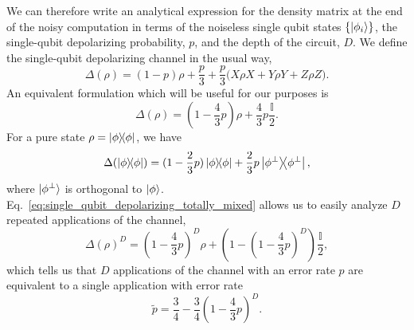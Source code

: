 \documentclass[
amsmath,
amssymb,
aps,
pra,
reprint,
twocolumn,
superscriptaddress,
longbibliography,
showkeys,
floatfix
]{revtex4-1}
\def\ket#1{\ensuremath{\mathinner{|{#1}\rangle}}}
\newcommand{\eq}[1]{Eq.~\hyperref[eq:#1]{\ref*{eq:#1}}}
\begin{document}
We can therefore write an analytical expression for the density matrix at the
end of the noisy computation in terms of the noiseless single qubit states
\(\{\ket{\phi_i}\}\), the single-qubit depolarizing probability, \(p\), and the
depth of the circuit, \(D\).
We define the single-qubit depolarizing channel in the usual way,
\begin{equation}
  \Delta(\rho) = (1-p) \rho + \frac{p}{3} + \frac{p}{3}\big(X\rho X + Y\rho Y + Z\rho Z \big).
  \label{eq:single_qubit_depolarizing}
\end{equation}
An equivalent formulation which will be useful for our purposes is
\begin{equation}
  \Delta(\rho) = (1 - \frac{4}{3}p) \rho + \frac{4}{3}p\frac{\mathbb{I}}{2}.
  \label{eq:single_qubit_depolarizing_totally_mixed}
\end{equation}
For a pure state \(\rho = \ketbra{\phi}\), we have
\begin{equation}
  \Delta(\ketbra{\phi}) = (1 - \frac{2}{3}p) \ketbra{\phi} + \frac{2}{3}p \ketbra{\phi^\perp},
\end{equation}
where \(\ket{\phi^\perp}\) is orthogonal to \(\ket{\phi}\).
\eq{single_qubit_depolarizing_totally_mixed} allows us to easily analyze \(D\)
repeated applications of the channel,
\begin{equation}
  \Delta(\rho)^D = (1 - \frac{4}{3}p)^D \rho + (1- (1 - \frac{4}{3}p)^D)\frac{\mathbb{I}}{2},
\end{equation}
which tells us that \(D\) applications of the channel with an error rate \(p\)
are equivalent to a single application with error rate
\begin{equation}
  \tilde{p} = \frac{3}{4} - \frac{3}{4}(1- \frac{4}{3} p)^D.
  \label{eq:renormalized_p}
\end{equation}
\end{document}
